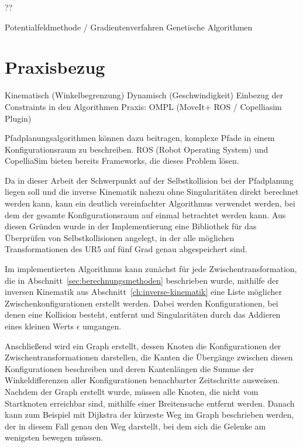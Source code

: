 ??

Potentialfeldmethode / Gradientenverfahren
Genetische Algorithmen


\section{Praxisbezug}\label{sec:praxisbezug}
Kinematisch (Winkelbegrenzung)
Dynamisch (Geschwindigkeit)
Einbezug der Constraints in den Algorithmen
Praxis: OMPL (MoveIt+ ROS / Copelliasim Plugin)

Pfadplanungsalgorithmen können dazu beitragen, komplexe Pfade in einem Konfigurationsraum zu beschreiben.
ROS (Robot Operating System) und CopelliaSim bieten bereits Frameworks, die dieses Problem lösen.

Da in dieser Arbeit der Schwerpunkt auf der Selbstkollision bei der Pfadplanung liegen soll und die inverse Kinematik nahezu ohne Singularitäten direkt berechnet werden kann, kann ein deutlich vereinfachter Algorithmus verwendet werden, bei dem der gesamte Konfigurationsraum auf einmal betrachtet werden kann.
Aus diesen Gründen wurde in der Implementierung eine Bibliothek für das Überprüfen von Selbstkollisionen angelegt, in der alle möglichen Transformationen des UR5 auf fünf Grad genau abgespeichert sind.

Im implementierten Algorithmus kann zunächst für jede Zwischentransformation, die in Abschnitt~\ref{sec:berechnungsmethoden} beschrieben wurde, mithilfe der inversen Kinematik aus Abschnitt~\ref{ch:inverse-kinematik} eine Liste möglicher Zwischenkonfigurationen erstellt werden.
Dabei werden Konfigurationen, bei denen eine Kollision besteht, entfernt und Singularitäten durch das Addieren eines kleinen Werts $\epsilon$ umgangen.

Anschließend wird ein Graph erstellt, dessen Knoten die Konfigurationen der Zwischentransformationen darstellen, die Kanten die Übergänge zwischen diesen Konfigurationen beschreiben und deren Kantenlängen die Summe der Winkeldifferenzen aller Konfigurationen benachbarter Zeitschritte ausweisen.
Nachdem der Graph erstellt wurde, müssen alle Knoten, die nicht vom Startknoten erreichbar sind, mithilfe einer Breitensuche entfernt werden.
Danach kann zum Beispiel mit Dijkstra der kürzeste Weg im Graph beschrieben werden, der in diesem Fall genau den Weg darstellt, bei dem sich die Gelenke am wenigsten bewegen müssen.

